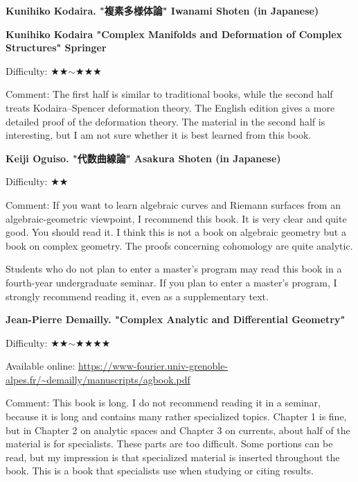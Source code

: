 \textbf{Kunihiko Kodaira. "複素多様体論" Iwanami Shoten  (in Japanese)}\vspace{-6pt}

\textbf{Kunihiko Kodaira "Complex Manifolds and Deformation of Complex Structures" Springer} \vspace{-6pt}

Difficulty: ★★$\sim$★★★ \vspace{-6pt} 

Comment: The first half is similar to traditional books, while the second half treats Kodaira--Spencer deformation theory. The English edition gives a more detailed proof of the deformation theory. The material in the second half is interesting, but I am not sure whether it is best learned from this book. 

\vspace{8pt}

\textbf{Keiji Oguiso. "代数曲線論" Asakura Shoten  (in Japanese)}\vspace{-6pt}

Difficulty: ★★ \vspace{-6pt} 

Comment: If you want to learn algebraic curves and Riemann surfaces from an algebraic-geometric viewpoint, I recommend this book. It is very clear and quite good. You should read it. 
I think this is not a book on algebraic geometry but a book on complex geometry. 
The proofs concerning cohomology are quite analytic. 

Students who do not plan to enter a master's program may read this book in a fourth-year undergraduate seminar. If you plan to enter a master's program, I strongly recommend reading it, even as a supplementary text.
\vspace{8pt}

\textbf{Jean-Pierre Demailly. "Complex Analytic and Differential Geometry"} \vspace{-6pt}

Difficulty: ★★$\sim$★★★★  \vspace{-6pt}

Available online: \url{https://www-fourier.univ-grenoble-alpes.fr/~demailly/manuscripts/agbook.pdf}\vspace{-6pt}

Comment: This book is long. I do not recommend reading it in a seminar, because it is long and contains many rather specialized topics. Chapter 1 is fine, but in Chapter 2 on analytic spaces and Chapter 3 on currents, about half of the material is for specialists. These parts are too difficult. Some portions can be read, but my impression is that specialized material is inserted throughout the book. This is a book that specialists use when studying or citing results.
\vspace{8pt}

